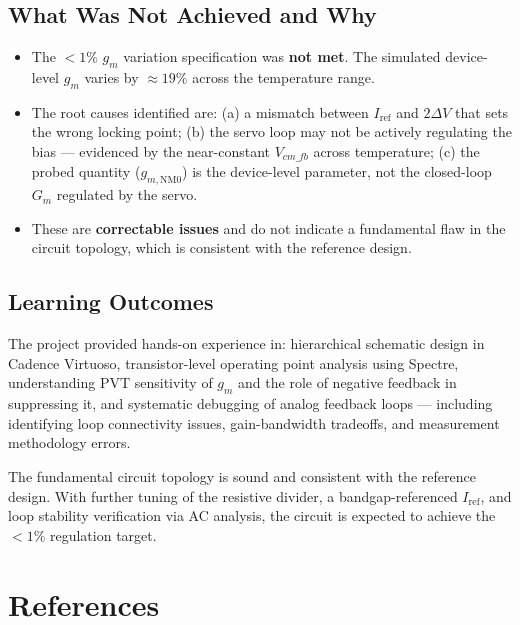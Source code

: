 \documentclass[12pt,a4paper]{article}
\begin{document}
\subsection*{What Was Not Achieved and Why}
\begin{itemize}[leftmargin=1.5em]
  \item The $< 1\%$ $g_m$ variation specification was \textbf{not met}. The simulated
        device-level $g_m$ varies by $\approx 19\%$ across the temperature range.
  \item The root causes identified are: (a) a mismatch between $I_{\text{ref}}$ and
        $2\Delta V$ that sets the wrong locking point; (b) the servo loop may not be
        actively regulating the bias — evidenced by the near-constant $V_{cm\_fb}$
        across temperature; (c) the probed quantity ($g_{m,\text{NM0}}$) is the
        device-level parameter, not the closed-loop $G_m$ regulated by the servo.
  \item These are \textbf{correctable issues} and do not indicate a fundamental flaw
        in the circuit topology, which is consistent with the reference design.
\end{itemize}

\subsection*{Learning Outcomes}
The project provided hands-on experience in:
hierarchical schematic design in Cadence Virtuoso,
transistor-level operating point analysis using Spectre,
understanding PVT sensitivity of $g_m$ and the role of negative feedback in suppressing it,
and systematic debugging of analog feedback loops — including identifying
loop connectivity issues, gain-bandwidth tradeoffs, and measurement methodology errors.

The fundamental circuit topology is sound and consistent with the reference design.
With further tuning of the resistive divider, a bandgap-referenced $I_{\text{ref}}$,
and loop stability verification via AC analysis, the circuit is expected to achieve
the $< 1\%$ regulation target.

\section*{References}
\end{document}
